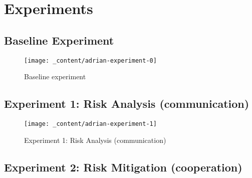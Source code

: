 \section{Experiments}
\label{sec:experiments}


\subsection{Baseline Experiment}

\begin{figure}[H]
    \centering
    \texttt{[image: \_content/adrian-experiment-0]}
    \caption{Baseline experiment}
    \label{fig:baseline}
\end{figure}

\subsection{Experiment 1: Risk Analysis (communication)}

\begin{figure}[H]
    \centering
    \texttt{[image: \_content/adrian-experiment-1]}
    \caption{Experiment 1: Risk Analysis (communication)}
    \label{fig:experiment-1}
\end{figure}

\subsection{Experiment 2: Risk Mitigation (cooperation)}

